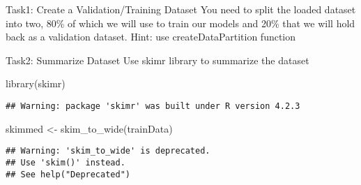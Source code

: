\documentclass[
]{article}
\newenvironment{Shaded}{\begin{snugshade}}{\end{snugshade}}
\newcommand{\AttributeTok}[1]{\textcolor[rgb]{0.77,0.63,0.00}{#1}}
\newcommand{\CommentTok}[1]{\textcolor[rgb]{0.56,0.35,0.01}{\textit{#1}}}
\newcommand{\ConstantTok}[1]{\textcolor[rgb]{0.00,0.00,0.00}{#1}}
\newcommand{\DecValTok}[1]{\textcolor[rgb]{0.00,0.00,0.81}{#1}}
\newcommand{\FloatTok}[1]{\textcolor[rgb]{0.00,0.00,0.81}{#1}}
\newcommand{\FunctionTok}[1]{\textcolor[rgb]{0.00,0.00,0.00}{#1}}
\newcommand{\NormalTok}[1]{#1}
\newcommand{\OtherTok}[1]{\textcolor[rgb]{0.56,0.35,0.01}{#1}}
\newcommand{\SpecialCharTok}[1]{\textcolor[rgb]{0.00,0.00,0.00}{#1}}
\begin{document}
Task1: Create a Validation/Training Dataset You need to split the loaded
dataset into two, 80\% of which we will use to train our models and 20\%
that we will hold back as a validation dataset. Hint: use
createDataPartition function

\begin{Shaded}
\end{Shaded}

Task2: Summarize Dataset Use skimr library to summarize the dataset

\begin{Shaded}
\begin{Highlighting}[]
\FunctionTok{library}\NormalTok{(skimr)}
\end{Highlighting}
\end{Shaded}

\begin{verbatim}
## Warning: package 'skimr' was built under R version 4.2.3
\end{verbatim}

\begin{Shaded}
\begin{Highlighting}[]
\NormalTok{skimmed }\OtherTok{\textless{}{-}} \FunctionTok{skim\_to\_wide}\NormalTok{(trainData)}
\end{Highlighting}
\end{Shaded}

\begin{verbatim}
## Warning: 'skim_to_wide' is deprecated.
## Use 'skim()' instead.
## See help("Deprecated")
\end{verbatim}
\end{document}
